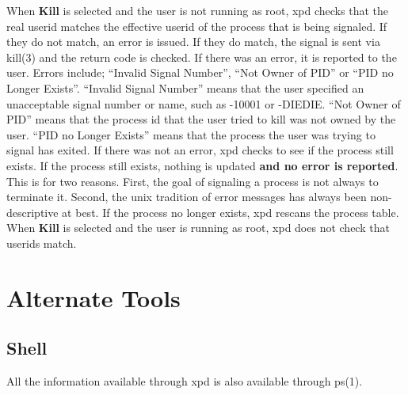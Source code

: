 When {\bf Kill} is selected and the user is not running as root, xpd checks that the real userid matches the effective userid of the process that is being signaled.
If they do not match, an error is issued.
If they do match, the signal is sent via kill(3) and the return code is checked.
If there was an error, it is reported to the user.
Errors include; ``Invalid Signal Number'', ``Not Owner of PID'' or ``PID no Longer Exists''.
``Invalid Signal Number'' means that the user specified an unacceptable signal number or name, such as -10001 or -DIEDIE.
``Not Owner of PID'' means that the process id that the user tried to kill was not owned by the user.
``PID no Longer Exists'' means that the process the user was trying to signal has exited.
If there was not an error, xpd checks to see if the process still exists.
If the process still exists, nothing is updated {\bf and no error is reported}.
This is for two reasons.
First, the goal of signaling a process is not always to terminate it.
Second, the unix tradition of error messages has always been non-descriptive at best.
If the process no longer exists, xpd rescans the process table.
When {\bf Kill} is selected and the user is running as root, xpd does not check that userids match.


\chapter{Alternate Tools}
\section{Shell}
All the information available through xpd is also available through ps(1).

